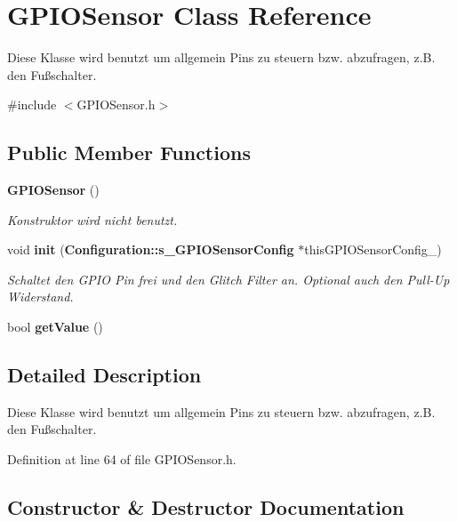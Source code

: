 \section{G\+P\+I\+O\+Sensor Class Reference}
\label{class_g_p_i_o_sensor}


Diese Klasse wird benutzt um allgemein Pins zu steuern bzw. abzufragen, z.\+B. den Fußschalter.  




{\ttfamily \#include $<$G\+P\+I\+O\+Sensor.\+h$>$}

\subsection*{Public Member Functions}
\begin{DoxyCompactItemize}
\item 
{\bf G\+P\+I\+O\+Sensor} ()
\begin{DoxyCompactList}\small\item\em Konstruktor wird nicht benutzt. \end{DoxyCompactList}\item 
void {\bf init} ({\bf Configuration\+::s\+\_\+\+G\+P\+I\+O\+Sensor\+Config} $\ast$this\+G\+P\+I\+O\+Sensor\+Config\+\_\+)
\begin{DoxyCompactList}\small\item\em Schaltet den G\+P\+I\+O Pin frei und den Glitch Filter an. Optional auch den Pull-\/\+Up Widerstand. \end{DoxyCompactList}\item 
bool {\bf get\+Value} ()
\end{DoxyCompactItemize}


\subsection{Detailed Description}
Diese Klasse wird benutzt um allgemein Pins zu steuern bzw. abzufragen, z.\+B. den Fußschalter. 

Definition at line 64 of file G\+P\+I\+O\+Sensor.\+h.



\subsection{Constructor \& Destructor Documentation}
